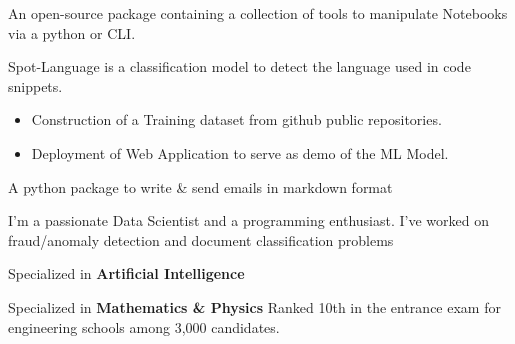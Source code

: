 \documentclass[10pt,letter,ragged2e,withhyper]{altacv}
\renewcommand{\divider}{\textcolor{body!30}{\hdashrule{\linewidth}{0.6pt}{0.5ex}}\medskip}
\begin{document}
\begin{paracol}{2}


An open-source package containing a collection of tools to manipulate Notebooks via a python or CLI.


\divider
{}

Spot-Language is a classification model to detect the language used in code snippets.

\begin{itemize}
      \item Construction of a Training dataset from github public repositories.
      \item Deployment of Web Application to serve as demo of the ML Model.
  \end{itemize}

\divider
{}

A python package to write \& send emails in markdown format




\switchcolumn
{}
{\small
I'm a passionate Data Scientist and a programming enthusiast. I've worked on fraud/anomaly detection and document classification problems
}


{\small Specialized in \textbf{Artificial Intelligence}}

\divider
{}
{\small Specialized in \textbf{Mathematics \& Physics}}
{\small Ranked 10th in the entrance exam for engineering schools among 3,000 candidates.}




\end{paracol}
\end{document}
